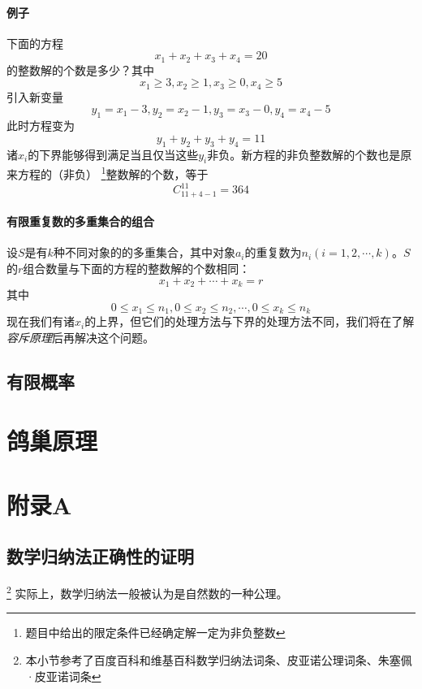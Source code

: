 \documentclass{ctexart}
\begin{document}
     \paragraph{例子}下面的方程
     \[x_1 + x_2 + x_3 + x_4 = 20\]
     的整数解的个数是多少？其中
     \[x_ 1 \geqslant 3 , x_2 \geqslant 1 ,x_3 \geqslant 0 ,x_4 \geqslant 5\]
     引入新变量
     \[y_1 = x_1 -3 , y_2 = x_2 - 1 , y_3 = x _3 - 0 ,y_4 = x_4 -5\]
     此时方程变为
     \[y_1 + y_2 + y_3 + y_4 = 11\]
     诸$x_i$的下界能够得到满足当且仅当这些$y_i$非负。新方程的非负整数解的个数也是原来方程的（非负）
     \footnote{题目中给出的限定条件已经确定解一定为非负整数}整数解的个数，等于
     \[C_{11+4-1}^{11} = 364\]
     \paragraph{有限重复数的多重集合的组合}
     设$S$是有$k$种不同对象的的多重集合，其中对象$a_i$的重复数为$n_i(i = 1,2,\cdots,k)$。$S$的$r$组合数量与下面的方程的整数解的个数相同：
     \[x_1 + x_2 + \cdots + x_k = r\]
     其中
     \[0 \leqslant x_1 \leqslant n_1 , 0 \leqslant x_2 \leqslant n_2,\cdots , 0 \leqslant x_k \leqslant n_k\]
     现在我们有诸$x_i$的上界，但它们的处理方法与下界的处理方法不同，我们将在了解\textit{容斥原理}后再解决这个问题。
   \subsection{有限概率}
   
   \section{鸽巢原理}
   \section{附录A}
    \subsection{数学归纳法正确性的证明}
    \footnote{本小节参考了百度百科和维基百科数学归纳法词条、皮亚诺公理词条、朱塞佩·皮亚诺词条}
    实际上，数学归纳法一般被认为是自然数的一种公理。
\end{document}
